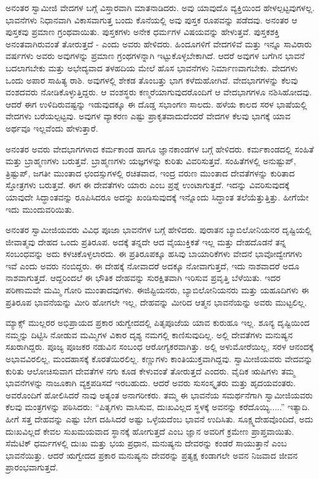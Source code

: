 ಅನಂತರ ಸ್ವಾಮೀಜಿ ವೇದಗಳ ಬಗ್ಗೆ ವಿಸ್ತಾರವಾಗಿ ಮಾತನಾಡಿದರು. ಅವು ಯಾವುದೊ ವ್ಯಕ್ತಿಯಿಂದ ಹೇಳಲ್ಪಟ್ಟವುಗಳಲ್ಲ. ಭಾವನೆಗಳು ನಿಧಾನವಾಗಿ ವಿಕಾಸವಾಗುತ್ತ ಬಂದು ಕೊನೆಯಲ್ಲಿ ಅವು ಪುಸ್ತಕ ರೂಪವನ್ನು ಪಡೆದವು. ಅನಂತರ ಆ ಪುಸ್ತಕವು ಪ್ರಮಾಣ ಗ್ರಂಥವಾಯಿತು. ಪುಸ್ತಕಗಳು ಅನೇಕ ಧರ್ಮಗಳ ವಿಷಯವನ್ನು ಹೇಳುತ್ತವೆ. ಪುಸ್ತಕಶಕ್ತಿ ಅನಂತವಾಗಿರುವಂತೆ ತೋರುತ್ತದೆ - ಎಂದು ಅವರು ಹೇಳಿದರು. ಹಿಂದೂಗಳಿಗೆ ವೇದಗಳಿವೆ ಮತ್ತು ಇನ್ನೂ ಸಾವಿರಾರು ವರ್ಷಗಳು ಅವರು ಅವುಗಳನ್ನು ಪ್ರಮಾಣ ಗ್ರಂಥಗಳನ್ನಾಗಿ ಇಟ್ಟುಕೊಳ್ಳಬೇಕಾಗಿದೆ. ಆದರೆ ಅವುಗಳ ಬಗೆಗಿನ ಭಾವನೆ ಬದಲಾಗಬೇಕು ಮತ್ತು ಅಭೇದ್ಯವಾದ ತಳಹದಿಯ ಮೇಲೆ ಹೊಸ ಭಾವನೆಗಳು ನಿರ್ಮಾಣವಾಗಬೇಕು. ವೇದಗಳು ಒಂದು ಅಪಾರ ಸಾಹಿತ್ಯ ರಾಶಿ. ಅವುಗಳಲ್ಲಿ ಶೇಕಡ ತೊಂಬತ್ತು ಭಾಗ ಕಳೆದುಹೋಗಿವೆ. ವೇದಭಾಗಗಳನ್ನು ಕೆಲವು ವಂಶದವರು ನೋಡಿಕೊಳ್ಳುತ್ತಿದ್ದರು. ಆ ವಂಶಸ್ಥರು ಕಣ್ಮರೆಯಾಗುವುದರೊಂದಿಗೆ ಆ ವೇದಭಾಗಗಳೂ ನಶಿಸಿಹೋದವು. ಆದರೆ ಈಗ ಉಳಿದಿರುವಷ್ಟನ್ನು ಇಡುವುದಕ್ಕೂ ಈ ದೊಡ್ಡ ಸಭಾಂಗಣ ಸಾಲದು. ಹಳೆಯ ಕಾಲದ ಸರಳ ಭಾಷೆಯಲ್ಲಿ ವೇದಗಳು ಬರೆಯಲ್ಪಟ್ಟವು. ಅವುಗಳ ವ್ಯಾಕರಣ ಎಷ್ಟು ಪ್ರಾಕೃತವಾದುದೆಂದರೆ ವೇದಗಳ ಕೆಲವು ಭಾಗಕ್ಕೆ ಯಾವ ಅರ್ಥವೂ ಇಲ್ಲವೆಂದು ಹೇಳುತ್ತಾರೆ.

ಅನಂತರ ಅವರು ವೇದಭಾಗಗಳಾದ ಕರ್ಮಕಾಂಡ ಹಾಗೂ ಜ್ಞಾನಕಾಂಡಗಳ ಬಗ್ಗೆ ಹೇಳಿದರು. ಕರ್ಮಕಾಂಡದಲ್ಲಿ ಸಂಹಿತೆ ಮತ್ತು ಬ್ರಾಹ್ಮಣಗಳು ಬರುತ್ತವೆ. ಬ್ರಾಹ್ಮಣಗಳು ಯಜ್ಞಗಳನ್ನು ಕುರಿತು ವಿವರಿಸುತ್ತವೆ. ಸಂಹಿತೆಗಳಲ್ಲಿ ಅನುಷ್ಟುಪ್​, ತ್ರಿಷ್ಟುಪ್​, ಜಗತೀ ಮುಂತಾದ ಛಂದಸ್ಸುಗಳಲ್ಲಿ ರಚಿತವಾದ, ಇಂದ್ರ ವರುಣ ಮುಂತಾದ ದೇವತೆಗಳನ್ನು ಕುರಿತಾದ ಸ್ತೋತ್ರಗಳು ಬರುತ್ತವೆ. ಈಗ ಈ ದೇವತೆಗಳು ಯಾರು ಎಂಬ ಪ್ರಶ್ನೆ ಉಂಟಾಗುತ್ತದೆ. ಇದನ್ನು ವಿವರಿಸುವುದಕ್ಕೆ ಯಾವುದೇ ಸಿದ್ಧಾಂತವನ್ನು ರೂಪಿಸಿದರೂ ಅದನ್ನು ಖಂಡಿಸುವುದಕ್ಕೆ ಇನ್ನೊಂದು ಸಿದ್ಧಾಂತ ತಲೆಯೆತ್ತುತ್ತಿತ್ತು. ಹೀಗೆಯೇ ಇದು ಮುಂದುವರಿಯಿತು.

ಅನಂತರ ಸ್ವಾಮೀಜಿಯವರು ವಿವಿಧ ಪೂಜಾ ಭಾವನೆಗಳ ಬಗ್ಗೆ ಹೇಳಿದರು. ಪುರಾತನ ಬ್ಯಾಬಿಲೋನಿಯನರ ದೃಷ್ಟಿಯಲ್ಲಿ ಜೀವಾತ್ಮವು ದೇಹದ ಒಂದು ಪ್ರತಿರೂಪ. ಅದಕ್ಕೆ ತನ್ನದೇ ಆದ ವೈಯುಕ್ತಿಕತೆ ಇಲ್ಲ ಮತ್ತು ದೇಹದೊಡನೆ ತನ್ನ ಸಂಬಂಧವನ್ನು ಅದು ಕಳಚಿಕೊಳ್ಳಲಾರದು. ಈ ಪ್ರತಿರೂಪಕ್ಕೂ ಹಸಿವು ಬಾಯಾರಿಕೆಗಳು ವೇದನೆ ಭಾವೋದ್ವೇಗಗಳು ಇವೆ ಎಂದು ಅವರು ನಂಬಿದ್ದರು. ಈ ದೇಹಕ್ಕೆ ನೋವಾದರೆ ಅದಕ್ಕೂ ನೋವಾಗುತ್ತದೆ, ಇದು ನಾಶವಾದರೆ ಅದೂ ನಾಶವಾಗುತ್ತದೆ. ಆದ್ದರಿಂದಲೆ ಈ ಭೌತಿಕ ದೇಹವನ್ನು ಸುರಕ್ಷಿತವಾಗಿ ಇರಿಸುವ ಪ್ರವೃತ್ತಿ ಬೆಳೆಯಿತು. ಇದರ ಪರಿಣಾಮವೇ ಮಮ್ಮಿ ಗೋರಿ ಮುಂತಾದವುಗಳು. ಈಜಿಪ್ಟಿಯನರು, ಬ್ಯಾಬಿಲೋನಿಯನರು ಮತ್ತು ಯಹೂದಿಗಳು ಈ ಪ್ರತಿರೂಪ ಭಾವನೆಯನ್ನು ಮೀರಿ ಹೋಗಲೇ ಇಲ್ಲ, ದೇಹವನ್ನು ಮೀರಿದ ಆತ್ಮನ ಭಾವನೆಯನ್ನು ಅವರು ಮುಟ್ಟಲಿಲ್ಲ.

ಮ್ಯಾಕ್ಸ್ ಮುಲ್ಲರರ ಅಭಿಪ್ರಾಯದ ಪ್ರಕಾರ ಋಗ್ವೇದದಲ್ಲಿ ಪಿತೃಪೂಜೆಯ ಯಾವ ಕುರುಹೂ ಇಲ್ಲ. ಶೂನ್ಯ ದೃಷ್ಟಿಯಿಂದ ನಮ್ಮನ್ನು ದಿಟ್ಟಿಸಿ ನೋಡುವ ಮಮ್ಮಿಗಳ ವಿಕಾರ ದೃಶ್ಯ ನಮಗಲ್ಲಿ ಕಾಣಿಸುವುದಿಲ್ಲ. ಅಲ್ಲಿ ದೇವತೆಗಳು ಮನುಷ್ಯನ ಸಖರಾಗಿದ್ದರು. ಪೂಜ್ಯ ಪೂಜಕರ ನಡುವಿನ ಸಂಬಂಧ ಆರೋಗ್ಯಕರವಾಗಿತ್ತು. ಅಲ್ಲಿ ಅಳುಮೋರೆಯಿಲ್ಲ, ಸರಳ ಆನಂದಕ್ಕೆ ಅಭಾವವಿರಲಿಲ್ಲ, ಮಂದಹಾಸಕ್ಕೆ ಕೊರತೆಯಿರಲಿಲ್ಲ. ಕಣ್ಣುಗಳು ಕಾಂತಿಯುಕ್ತವಾಗಿದ್ದವು. ಸ್ವಾಮೀಜಿಯವರು ವೇದವನ್ನು ಕುರಿತು ಆಲೋಚಿಸುವಾಗ ದೇವತೆಗಳ ನಗು ಕೂಡ ಕೇಳುವಂತೆ ತೋರುತ್ತದೆ ಎಂದರು. ವೈದಿಕ ಋಷಿಗಳು ತಮ್ಮ ಭಾವನೆಗಳನ್ನು ನಾಜೂಕಾಗಿ ವ್ಯಕ್ತಪಡಿಸದೆ ಇರಬಹುದು. ಆದರೆ ಅವರು ಸುಸಂಸ್ಕೃತರು ಮತ್ತು ಹೃದಯವಂತರು. ಅವರೊಂದಿಗೆ ಹೋಲಿಸಿದರೆ ನಾವು ಅತ್ಯಂತ ಅನಾಗರೀಕರು. ತಮ್ಮ ಈ ಭಾವನೆಯ ಸಮರ್ಥನೆಗಾಗಿ ಸ್ವಾಮೀಜಿಯವರು ಕೆಲವು ಮಂತ್ರಗಳನ್ನು ಪಠಿಸಿದರು: “ಪಿತೃಗಳು ವಾಸಿಸುವ, ದುಃಖವಿಲ್ಲದ ಸ್ಥಳಕ್ಕೆ ಅವನನ್ನು ಕರೆದೊಯ್ಯಿ.....” ಇತ್ಯಾದಿ. ಹೀಗೆ ಸತ್ತ ದೇಹವನ್ನು ಎಷ್ಟು ಬೇಗ ದಹಿಸಿದರೆ ಅಷ್ಟು ಒಳ್ಳೆಯದೆಂಬ ಭಾವನೆ ಉದಿಸಿತು. ಸೂಕ್ಷ್ಮದೇಹವೊಂದಿದೆ, ಅದು ದುಃಖವಿಲ್ಲದೆ ಕೇವಲ ಸುಖಮಯವಾದ ಸ್ಥಾನಕ್ಕೆ ಹೋಗುತ್ತದೆ ಎಂಬ ಜ್ಞಾನ ಅವರಿಗೆ ಕ್ರಮೇಣ ಪ್ರಾಪ್ತವಾಯಿತು. ಸೆಮೆಟಿಕ್​ ಧರ್ಮಗಳಲ್ಲಿ ದುಃಖ ಮತ್ತು ಭಯ ಪ್ರಧಾನ, ಮನುಷ್ಯನು ದೇವರನ್ನು ಕಂಡರೆ ಸಾಯುತ್ತಾನೆ ಎಂಬ ಭಾವನೆಯಿತ್ತು. ಆದರೆ ಋಗ್ವೇದದ ಪ್ರಕಾರ ಮನುಷ್ಯನು ದೇವರನ್ನು ಪ್ರತ್ಯಕ್ಷ ಕಂಡಾಗಲೇ ಅವನ ನಿಜವಾದ ಜೀವನ ಪ್ರಾರಂಭವಾಗುತ್ತದೆ.

